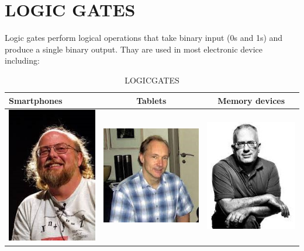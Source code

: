 \documentclass{article}
\begin{document}
	\section{LOGIC GATES}
	Logic gates perform logical operations that take binary input (0s and 1s) and produce a single binary output. Thay are used in most electronic device including:
	
    \begin{table}[h!]
    	\begin{center}
    		\caption{LOGICGATES}
    		\label{tab:table1}
    		\begin{tabular}{|l|c|c|}
    			\hline
    			Smartphones
    			&
    			Tablets
    			&
    			Memory devices
    			\\
    		\hline
    		\includegraphics[width=0.5\linewidth]{picture2}
    		&
    		\includegraphics[width=0.5\linewidth]{picture1}
    		&
    		\includegraphics[width=0.3\linewidth]{picture5}
    		\\
    		  \hline
    		  
    	  \end{tabular}
    	\end{center}
    \end{table}
\end{document}
